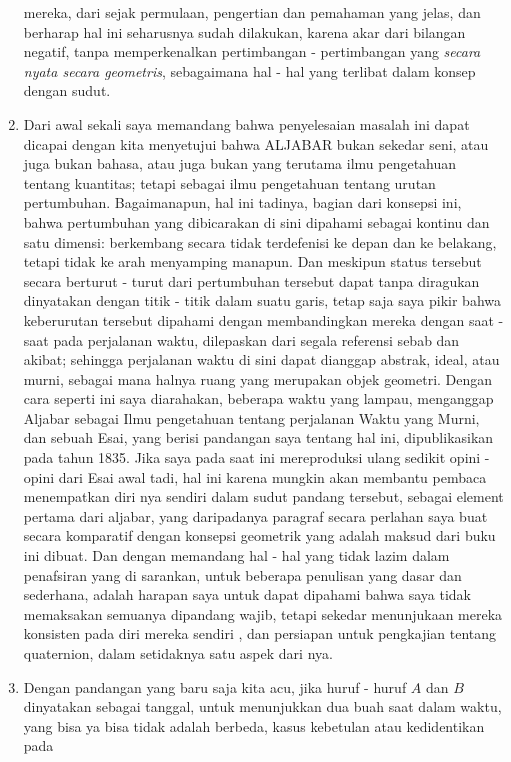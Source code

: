 \documentclass[a4paper, 12pt]{book}
\begin{document}
\begin{enumerate}
mereka, dari sejak permulaan, pengertian dan pemahaman yang jelas, dan berharap
hal ini seharusnya sudah dilakukan, karena akar dari bilangan negatif, tanpa
memperkenalkan pertimbangan - pertimbangan yang 
\textit{secara nyata secara geometris}, 
sebagaimana hal - hal yang terlibat dalam konsep dengan sudut.
\item Dari awal sekali saya memandang bahwa penyelesaian masalah ini dapat 
dicapai dengan kita menyetujui bahwa ALJABAR bukan sekedar seni, atau juga 
bukan bahasa, atau juga bukan yang terutama ilmu pengetahuan tentang kuantitas;
tetapi sebagai ilmu pengetahuan tentang urutan pertumbuhan. Bagaimanapun, hal
ini tadinya, bagian dari konsepsi ini, bahwa pertumbuhan yang dibicarakan 
di sini dipahami sebagai kontinu dan satu dimensi: berkembang secara tidak 
terdefenisi ke depan dan ke belakang, tetapi tidak ke arah menyamping manapun.
Dan meskipun status tersebut secara berturut - turut dari pertumbuhan tersebut
dapat tanpa diragukan dinyatakan dengan titik - titik dalam suatu garis, tetap
saja saya pikir bahwa keberurutan tersebut dipahami dengan membandingkan mereka
dengan saat - saat pada perjalanan waktu, dilepaskan dari segala referensi
sebab dan akibat; sehingga perjalanan waktu di sini dapat dianggap abstrak, 
ideal, atau murni, sebagai mana halnya ruang yang merupakan objek geometri.
Dengan cara seperti ini saya diarahakan, beberapa waktu yang lampau, 
menganggap Aljabar sebagai Ilmu pengetahuan tentang perjalanan Waktu yang Murni,
dan sebuah Esai, yang berisi pandangan saya tentang hal ini, dipublikasikan
pada tahun 1835. Jika saya pada saat ini mereproduksi ulang sedikit opini
- opini dari Esai awal tadi, hal ini karena mungkin akan membantu pembaca 
menempatkan diri nya sendiri dalam sudut pandang tersebut, sebagai element
pertama dari aljabar, yang daripadanya paragraf secara perlahan saya buat 
secara komparatif dengan  konsepsi geometrik yang adalah maksud dari buku
ini dibuat. Dan dengan memandang hal - hal yang tidak lazim dalam penafsiran
yang di sarankan, untuk beberapa penulisan yang dasar dan sederhana, adalah
harapan saya untuk dapat dipahami bahwa saya tidak memaksakan semuanya 
dipandang wajib, tetapi sekedar menunjukaan mereka konsisten pada diri mereka
sendiri , dan persiapan untuk pengkajian tentang quaternion, dalam setidaknya
satu aspek dari nya.
\item Dengan pandangan yang baru saja kita acu, jika huruf - huruf $A$ dan
$B$ dinyatakan sebagai tanggal, untuk menunjukkan dua buah saat dalam waktu,
yang bisa ya bisa tidak adalah berbeda, kasus kebetulan atau kedidentikan pada

\end{enumerate}
\end{document}
